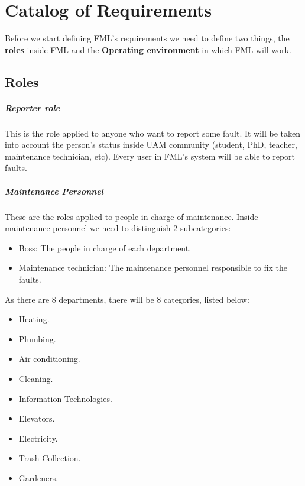 \chapter{Catalog of Requirements}
\label{secRequirements}

Before we start defining FML's requirements we need to define two things, the \textbf{roles} inside FML and the \textbf{Operating environment} in which FML will work.


\label{chapRequirements}
\section{Roles}

\paragraph{Reporter role} \label{ReporterRole} This is the role applied to anyone who want to report some fault. It will be taken into account the person's status inside UAM community (student, PhD, teacher, maintenance technician, etc). Every user in FML's system will be able to report faults.

\paragraph{Maintenance Personnel} \label{MaintenancePersonnel}

These are the roles applied to people in charge of maintenance. Inside maintenance personnel we need to distinguish 2 subcategories:

\begin{itemize}
\item Boss: The people in charge of each department.
\item Maintenance technician: The maintenance personnel responsible to fix the faults.
\end{itemize}

As there are 8 departments, there will be 8 categories, listed below:

\begin{itemize}
\item Heating.
\item Plumbing.
\item Air conditioning.
\item Cleaning.
\item Information Technologies.
\item Elevators.
\item Electricity.
\item Trash Collection.
\item Gardeners.
\end{itemize}

